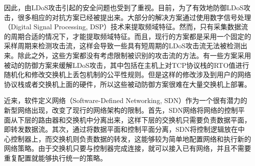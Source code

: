 因此，由LDoS攻击引起的安全问题也受到了重视。目前，为了有效地防御LDoS攻击，很多相应的对抗方案已经被提出来。大部分的解决方案\cite{b1,b4, b6, b7, b22}通过使用数字信号处理（Digital Signal Processing, DSP）技术来提取频域特征。然而，只有采集数据流的周期合适的情况下，才能提取频域特征。而且，现行的方案都是采用一个固定的采样周期来检测攻击流，这样会导致一些具有短周期的LDoS攻击流无法被检测出来。除此之外，这些方案都没有考虑限制被识别的攻击流的方法。有一些方案\cite{b22,patel2016throughput, b17}采用被动的防御方案来缓解LDoS攻击，其中包括在主机上对TCP协议栈的RTO值进行随机化和修改交换机上丢包机制的公平性规则。但是这样的修改涉及到用户的网络协议栈或者交换机上面的硬件，所以这些被动防御方案很难在大量交换机上部署。

近来，软件定义网络（Software-Defined Networking, SDN）作为一个很有潜力的新型网络出现，改变了现行的网络架构的限制。首先，SDN网络将网络的控制平面从下层的路由器和交换机中分离出来，这样下层的交换机只需要负责数据平面，即转发数据流。其次，通过将数据平面和控制平面分离，SDN将控制逻辑放在中心控制器上，而交换机则负责数据的转发，这能够较为简单地配置网络和执行新的网络策略。由于交换机只要与控制器完成连接，就可以接入已有网络，并且不需要重复配置就能够执行统一的策略。



